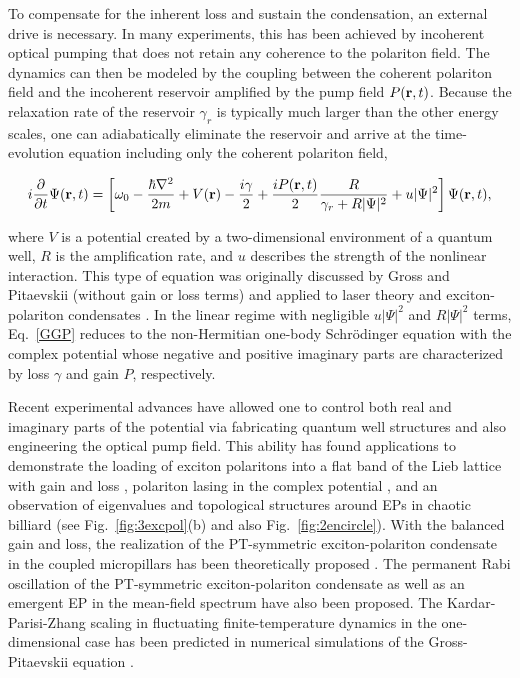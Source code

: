 \documentclass{tADP2e}
\theoremstyle{plain}
\newcommand{\eqn}[1]{
\begin{eqnarray}
	#1
\end{eqnarray}
}
\theoremstyle{plain}
\theoremstyle{definition}
\begin{document}
To compensate for the inherent  loss and sustain the condensation, an external drive is necessary. In many experiments, this has been achieved by incoherent optical pumping that does not retain any coherence to the polariton field. 
The dynamics can then be modeled by the coupling between the coherent polariton field and the incoherent reservoir amplified by the pump field $P({\bf r},t)$.
Because the relaxation rate of the reservoir $\gamma_r$ is typically much larger than the other energy scales, one can adiabatically eliminate the reservoir and arrive at the time-evolution equation including only the coherent polariton field,
\eqn{\label{GGP}
i\frac{\partial}{\partial t}\Psi({\bf r},t)=\left[\omega_{0}-\frac{\hbar\nabla^2}{2m}+V({\bf r})-\frac{i\gamma}{2}+\frac{iP({\bf r},t)}{2}\frac{R}{\gamma_r+R|\Psi|^2}+u|\Psi|^2\right]\Psi({\bf r},t),
}
where $V$ is a potential created by a two-dimensional environment of a quantum well, $R$ is the amplification rate, and $u$ describes the strength of the nonlinear interaction.
This type of equation was originally discussed by Gross \cite{Gross1961} and Pitaevskii \cite{Pitaevskii61} (without gain or loss terms) and applied to laser theory \cite{LWE64}  and  exciton-polariton condensates \cite{WM07}.
In the linear regime with negligible $u|\Psi|^2$ and $R|\Psi|^2$ terms, Eq.~\eqref{GGP} reduces to the non-Hermitian one-body Schr{\"o}dinger equation with the complex potential whose negative and positive imaginary parts are characterized by loss $\gamma$ and gain $P$, respectively.

Recent experimental advances have allowed one to control both real and imaginary parts of the potential via fabricating quantum well structures and also engineering the optical pump field. This ability has found applications to demonstrate the loading of exciton polaritons into a flat band of the  Lieb lattice with gain and loss \cite{BF162}, polariton lasing in the complex potential \cite{ZL15}, and an observation of eigenvalues and topological structures around EPs in chaotic billiard \cite{GT15} (see Fig.~\ref{fig:3excpol}(b) and also Fig.~\ref{fig:2encircle}). 
With the balanced gain and loss, the realization of  the PT-symmetric exciton-polariton condensate in the coupled micropillars has been theoretically proposed \cite{LJY15}. The permanent Rabi oscillation of the PT-symmetric exciton-polariton condensate \cite{CIY16} as well as an emergent EP in the mean-field spectrum \cite{HR192} have also been proposed. The Kardar-Parisi-Zhang scaling in fluctuating finite-temperature dynamics in the one-dimensional case has been predicted in numerical simulations of the Gross-Pitaevskii equation \cite{KM13}. 
 
\end{document}
